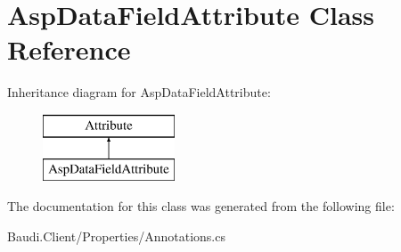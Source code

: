 \hypertarget{class_asp_data_field_attribute}{}\section{Asp\+Data\+Field\+Attribute Class Reference}
\label{class_asp_data_field_attribute}
Inheritance diagram for Asp\+Data\+Field\+Attribute\+:\begin{figure}[H]
\begin{center}
\leavevmode
\includegraphics[height=2.000000cm]{class_asp_data_field_attribute}
\end{center}
\end{figure}


The documentation for this class was generated from the following file\+:\begin{DoxyCompactItemize}
\item 
Baudi.\+Client/\+Properties/Annotations.\+cs\end{DoxyCompactItemize}
